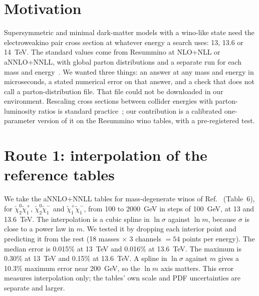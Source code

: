 \documentclass[aps,prd,twocolumn,superscriptaddress,nofootinbib,showkeys]{revtex4-2}
\begin{document}
\section{Motivation}
Supersymmetric and minimal dark-matter models with a wino-like state need the electroweakino pair cross section at whatever energy a search uses: 13, 13.6 or 14~TeV. The standard values come from Resummino at NLO+NLL or aNNLO+NNLL, with global parton distributions and a separate run for each mass and energy~\cite{Res}. We wanted three things: an answer at any mass and energy in microseconds, a stated numerical error on that answer, and a check that does not call a parton-distribution file. That file could not be downloaded in our environment. Rescaling cross sections between collider energies with parton-luminosity ratios is standard practice~\cite{Quigg}; our contribution is a calibrated one-parameter version of it on the Resummino wino tables, with a pre-registered test.

\section{Route 1: interpolation of the reference tables}
We take the aNNLO+NNLL tables for mass-degenerate winos of Ref.~\cite{Res} (Table~6), for $\tilde\chi_2^0\tilde\chi_1^+$, $\tilde\chi_2^0\tilde\chi_1^-$ and $\tilde\chi_1^+\tilde\chi_1^-$, from 100 to 2000~GeV in steps of 100~GeV, at 13 and 13.6~TeV. The interpolation is a cubic spline in $\ln\sigma$ against $\ln m$, because $\sigma$ is close to a power law in $m$. We tested it by dropping each interior point and predicting it from the rest (18 masses $\times$ 3 channels $=54$ points per energy). The median error is 0.015\% at 13~TeV and 0.016\% at 13.6~TeV. The maximum is 0.30\% at 13~TeV and 0.15\% at 13.6~TeV. A spline in $\ln\sigma$ against $m$ gives a 10.3\% maximum error near 200~GeV, so the $\ln m$ axis matters. This error measures interpolation only; the tables' own scale and PDF uncertainties are separate and larger.
\end{document}
